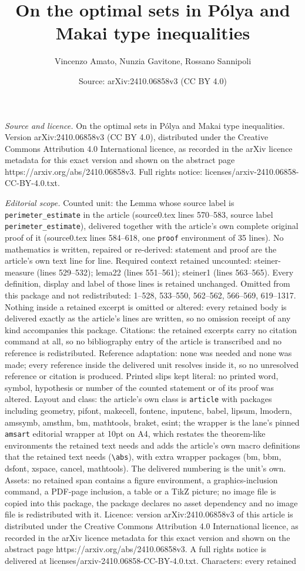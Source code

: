 \documentclass[10pt,a4paper]{amsart}
\title[On the optimal sets in P\'olya and Makai type inequalities]{On the optimal sets in P\'olya and Makai type inequalities}
\author{Vincenzo Amato, Nunzia Gavitone, Rossano Sannipoli}
\date{Source: arXiv:2410.06858v3 (CC BY 4.0)}
\begin{document}
\maketitle

\noindent\emph{Source and licence.} On the optimal sets in P\'olya and Makai type inequalities. Version arXiv:2410.06858v3 (CC BY 4.0), distributed under the Creative Commons Attribution 4.0 International licence, as recorded in the arXiv licence metadata for this exact version and shown on the abstract page https://arxiv.org/abs/2410.06858v3. Full rights notice: licenses/arxiv-2410.06858-CC-BY-4.0.txt.\par\smallskip

\noindent\textit{Editorial scope.} Counted unit: the Lemma whose source label is \texttt{perimeter\_estimate} in the article (source0.tex lines 570--583, source label \texttt{perimeter\_estimate}), delivered together with the article's own complete original proof of it (source0.tex lines 584--618, one \texttt{proof} environment of 35 lines). No mathematics is written, repaired or re-derived: statement and proof are the article's own text line for line. Required context retained uncounted: steiner-measure (lines 529--532); lema22 (lines 551--561); steiner1 (lines 563--565). Every definition, display and label of those lines is retained unchanged. Omitted from this package and not redistributed: 1--528, 533--550, 562--562, 566--569, 619--1317. Nothing inside a retained excerpt is omitted or altered: every retained body is delivered exactly as the article's lines are written, so no omission receipt of any kind accompanies this package. Citations: the retained excerpts carry no citation command at all, so no bibliography entry of the article is transcribed and no reference is redistributed. Reference adaptation: none was needed and none was made; every reference inside the delivered unit resolves inside it, so no unresolved reference or citation is produced. Printed slips kept literal: no printed word, symbol, hypothesis or number of the counted statement or of its proof was altered. Layout and class: the article's own class is \texttt{article} with packages including geometry, pifont, makecell, fontenc, inputenc, babel, lipsum, lmodern, amssymb, amsthm, bm, mathtools, braket, esint; the wrapper is the lane's pinned \texttt{amsart} editorial wrapper at 10pt on A4, which restates the theorem-like environments the retained text needs and adds the article's own macro definitions that the retained text needs (\texttt{\textbackslash abs}), with extra wrapper packages (bm, bbm, dsfont, xspace, cancel, mathtools). The delivered numbering is the unit's own. Assets: no retained span contains a figure environment, a graphics-inclusion command, a PDF-page inclusion, a table or a TikZ picture; no image file is copied into this package, the package declares no asset dependency and no image file is redistributed with it. Licence: version arXiv:2410.06858v3 of this article is distributed under the Creative Commons Attribution 4.0 International licence, as recorded in the arXiv licence metadata for this exact version and shown on the abstract page https://arxiv.org/abs/2410.06858v3. A full rights notice is delivered at licenses/arxiv-2410.06858-CC-BY-4.0.txt. Characters: every retained 
\end{document}
